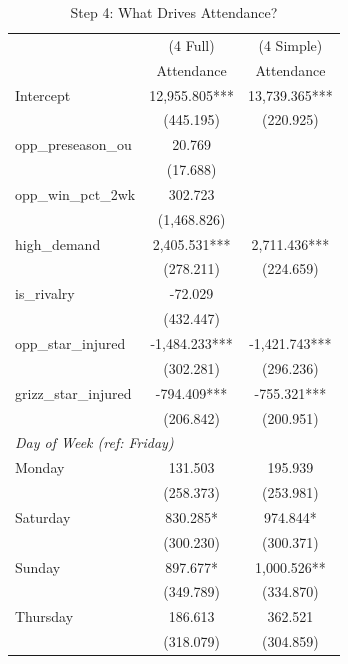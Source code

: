 \documentclass[12pt]{article}
\begin{document}
\begin{table}[h!]
\centering
\caption{Step 4: What Drives Attendance?}
\begin{tabular}{lcc}
\toprule
 & (4 Full) & (4 Simple) \\
 & Attendance & Attendance \\
\midrule
Intercept              & 12,955.805*** & 13,739.365*** \\
                       & (445.195)     & (220.925)     \\
opp\_preseason\_ou     & 20.769        &               \\
                       & (17.688)      &               \\
opp\_win\_pct\_2wk     & 302.723       &               \\
                       & (1,468.826)   &               \\
high\_demand           & 2,405.531***  & 2,711.436***  \\
                       & (278.211)     & (224.659)     \\
is\_rivalry            & -72.029       &               \\
                       & (432.447)     &               \\
opp\_star\_injured     & -1,484.233*** & -1,421.743*** \\
                       & (302.281)     & (296.236)     \\
grizz\_star\_injured   & -794.409***   & -755.321***   \\
                       & (206.842)     & (200.951)     \\
\midrule
\multicolumn{3}{l}{\textit{Day of Week (ref: Friday)}} \\
Monday                 & 131.503       & 195.939       \\
                       & (258.373)     & (253.981)     \\
Saturday               & 830.285*      & 974.844*      \\
                       & (300.230)     & (300.371)     \\
Sunday                 & 897.677*      & 1,000.526**   \\
                       & (349.789)     & (334.870)     \\
Thursday               & 186.613       & 362.521       \\
                       & (318.079)     & (304.859)     \\

\end{tabular}
\end{table}
\end{document}
